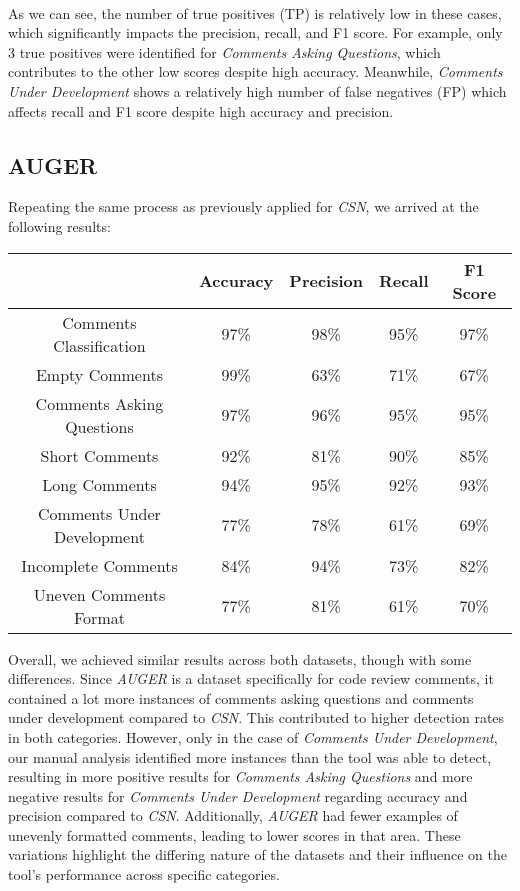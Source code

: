 \noindent \\ As we can see, the number of true positives (TP) is relatively low in these cases, which significantly impacts the precision, recall, and F1 score. For example, only 3 true positives were identified for \textit{Comments Asking Questions}, which contributes to the other low scores despite high accuracy. Meanwhile, \textit{Comments Under Development} shows a relatively high number of false negatives (FP) which affects recall and F1 score despite high accuracy and precision.

\subsection{AUGER}
Repeating the same process as previously applied for \textit{CSN}, we arrived at the following results:

\begin{center}
	\begin{tabular}{|c|c|c|c|c|}
		\hline
		& \textbf{Accuracy} & \textbf{Precision} & \textbf{Recall} & \textbf{F1 Score} \\
		\hline Comments Classification    & 97\%     & 98\%      & 95\%   & 97\%    \\
		\hline Empty Comments             & 99\%     & 63\%      & 71\%   & 67\%    \\
		\hline Comments Asking Questions  & 97\%     & 96\%      & 95\%   & 95\%    \\
		\hline Short Comments             & 92\%     & 81\%      & 90\%   & 85\%    \\
		\hline Long Comments              & 94\%     & 95\%      & 92\%   & 93\%    \\
		\hline Comments Under Development & 77\%     & 78\%      & 61\%   & 69\%    \\
		\hline Incomplete Comments        & 84\%     & 94\%      & 73\%   & 82\%    \\
		\hline Uneven Comments Format     & 77\%     & 81\%      & 61\%   & 70\%   \\
		\hline
	\end{tabular}
\end{center}

\noindent Overall, we achieved similar results across both datasets, though with some differences. Since \textit{AUGER} is a dataset specifically for code review comments, it contained a lot more instances of comments asking questions and comments under development compared to \textit{CSN}. This contributed to higher detection rates in both categories. However, only in the case of \textit{Comments Under Development}, our manual analysis identified more instances than the tool was able to detect, resulting in more positive results for \textit{Comments Asking Questions} and more negative results for \textit{Comments Under Development} regarding accuracy and precision compared to \textit{CSN}. Additionally, \textit{AUGER} had fewer examples of unevenly formatted comments, leading to lower scores in that area. These variations highlight the differing nature of the datasets and their influence on the tool's performance across specific categories.

